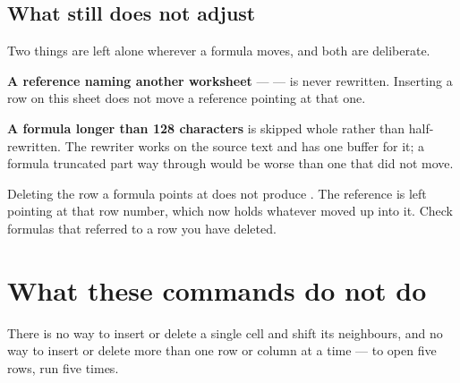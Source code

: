 \subsection{What still does not adjust}

\begin{cccaution}
Two things are left alone wherever a formula moves, and both are deliberate.

\textbf{A reference naming another worksheet} ---  --- is never
rewritten. Inserting a row on this sheet does not move a reference pointing at
that one.

\textbf{A formula longer than 128 characters} is skipped whole rather than
half-rewritten. The rewriter works on the source text and has one buffer for
it; a formula truncated part way through would be worse than one that did not
move.
\end{cccaution}

\begin{ccnote}
Deleting the row a formula points at does not produce . The
reference is left pointing at that row number, which now holds whatever moved
up into it. Check formulas that referred to a row you have deleted.
\end{ccnote}

\section{What these commands do not do}

There is no way to insert or delete a single cell and shift its neighbours, and
no way to insert or delete more than one row or column at a time --- to open
five rows, run  five times.
